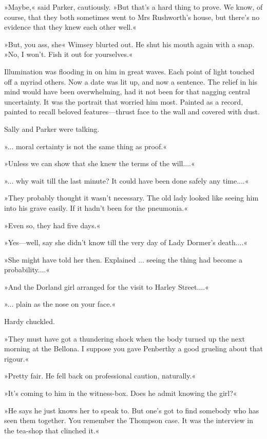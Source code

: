 »Maybe,« said Parker, cautiously. »But that's a hard thing to prove. We know, of course, that they both sometimes went to Mrs Rushworth's house, but there's no evidence that they knew each other well.«

»But, you ass, she\longdash« Wimsey blurted out. He shut his mouth again with a snap. »No, I won't. Fish it out for yourselves.«

Illumination was flooding in on him in great waves. Each point of light touched off a myriad others. Now a date was lit up, and now a sentence. The relief in his mind would have been overwhelming, had it not been for that nagging central uncertainty. It was the portrait that worried him most. Painted as a record, painted to recall beloved features\allowbreak---\allowbreak thrust face to the wall and covered with dust.

Sally and Parker were talking.

»... moral certainty is not the same thing as proof.«

»Unless we can show that she knew the terms of the will....«

»... why wait till the last minute? It could have been done safely any time....«

»They probably thought it wasn't necessary. The old lady looked like seeing him into his grave easily. If it hadn't been for the pneumonia.«

»Even so, they had five days.«

»Yes\allowbreak---\allowbreak well, say she didn't know till the very day of Lady Dormer's death....«

»She might have told her then. Explained ... seeing the thing had become a probability....«

»And the Dorland girl arranged for the visit to Harley Street....«

»... plain as the nose on your face.«

Hardy chuckled.

»They must have got a thundering shock when the body turned up the next morning at the Bellona. I suppose you gave Penberthy a good grueling about that rigour.«

»Pretty fair. He fell back on professional caution, naturally.«

»It's coming to him in the witness-box. Does he admit knowing the girl?«

»He says he just knows her to speak to. But one's got to find somebody who has seen them together. You remember the Thompson case. It was the interview in the tea-shop that clinched it.«

